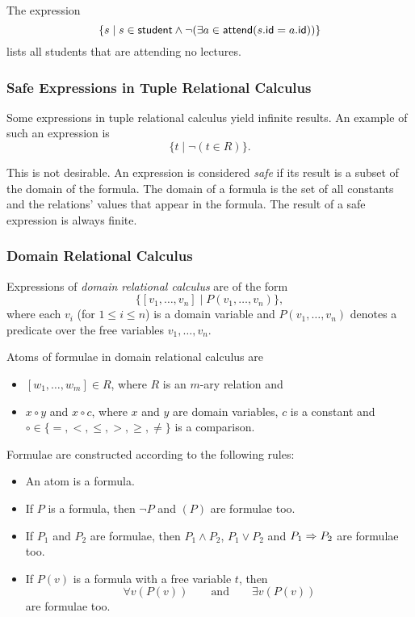 \begin{example} The expression
\[ \{
s \mid
s \in \mathsf{student} \wedge
\neg (\exists a \in \mathsf{attend}(s.\mathsf{id}=a.\mathsf{id}))
\} \]
lists all students that are attending no lectures.
\end{example}




\subsubsection[Safe Expressions in TRC]{Safe Expressions in Tuple Relational Calculus}

Some expressions in tuple relational calculus yield infinite results. An example of such an expression is
\[ \{ t \mid \neg(t \in R) \}. \]

This is not desirable. An expression is considered \emph{safe} if its result is a subset of the domain of the formula. The domain of a formula is the set of all constants and the relations' values that appear in the formula. The result of a safe expression is always finite.




\subsubsection{Domain Relational Calculus}

Expressions of \emph{domain relational calculus} are of the form
\[ \{[v_1,\ldots,v_n] \mid P(v_1,\ldots,v_n) \}, \]
where each $v_i$ (for $1 \leq i \leq n$) is a domain variable and $P(v_1,\ldots,v_n)$ denotes a predicate over the free variables $v_1,\ldots,v_n$.

Atoms of formulae in domain relational calculus are
\begin{itemize}
\item $[w_1,\ldots,w_m] \in R$, where $R$ is an $m$-ary relation and
\item $x \circ y$ and $x \circ c$, where $x$ and $y$ are domain variables, $c$ is a constant and $\circ \in \{=,<,\leq,>,\geq,\neq\}$ is a comparison.
\end{itemize}

Formulae are constructed according to the following rules:
\begin{itemize}
\item
	An atom is a formula.
\item
	If $P$ is a formula, then $\neg P$ and $(P)$ are formulae too.
\item
	If $P_1$ and $P_2$ are formulae, then $P_1 \wedge P_2$, $P_1 \vee P_2$ and $P_1 \Rightarrow P_2$ are formulae too.
\item
	If $P(v)$ is a formula with a free variable $t$, then
	\[ \forall v (P(v))
	\qquad\text{and}\qquad
	\exists v (P(v)) \]
	are formulae too.
\end{itemize}

